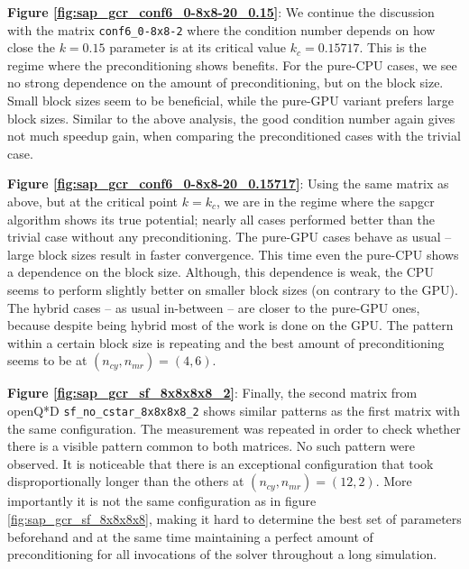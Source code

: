 \documentclass{article}
\theoremstyle{plain} %
\theoremstyle{convention} %
\theoremstyle{remark} %
\def\code#1{\texttt{#1}}
\numberwithin{equation}{section}
\begin{document}
\textbf{Figure \ref{fig:sap_gcr_conf6_0-8x8-20_0.15}}: We continue the discussion with the matrix \code{conf6\_0-8x8-2} where the condition number depends on how close the $k = 0.15$ parameter is at its critical value $k_c = 0.15717$. This is the regime where the preconditioning shows benefits. For the pure-CPU cases, we see no strong dependence on the amount of preconditioning, but on the block size. Small block sizes seem to be beneficial, while the pure-GPU variant prefers large block sizes. Similar to the above analysis, the good condition number again gives not much speedup gain, when comparing the preconditioned cases with the trivial case.

\textbf{Figure \ref{fig:sap_gcr_conf6_0-8x8-20_0.15717}}: Using the same matrix as above, but at the critical point $k=k_c$, we are in the regime where the \acrshort{sapgcr} algorithm shows its true potential; nearly all cases performed better than the trivial case without any preconditioning. The pure-GPU cases behave as usual -- large block sizes result in faster convergence. This time even the pure-CPU shows a dependence on the block size. Although, this dependence is weak, the CPU seems to perform slightly better on smaller block sizes (on contrary to the GPU). The hybrid cases -- as usual in-between -- are closer to the pure-GPU ones, because despite being hybrid most of the work is done on the GPU. The pattern within a certain block size is repeating and the best amount of preconditioning seems to be at $(n_{cy}, n_{mr}) = (4,6)$.

\textbf{Figure \ref{fig:sap_gcr_sf_8x8x8x8_2}}: Finally, the second matrix from openQ*D \code{sf\_no\_cstar\_8x8x8x8\_2} shows similar patterns as the first matrix with the same configuration. The measurement was repeated in order to check whether there is a visible pattern common to both matrices. No such pattern were observed. It is noticeable that there is an exceptional configuration that took disproportionally longer than the others at $(n_{cy}, n_{mr}) = (12,2)$. More importantly it is not the same configuration as in figure \ref{fig:sap_gcr_sf_8x8x8x8}, making it hard to determine the best set of parameters beforehand and at the same time maintaining a perfect amount of preconditioning for all invocations of the solver throughout a long simulation.

\end{document}
